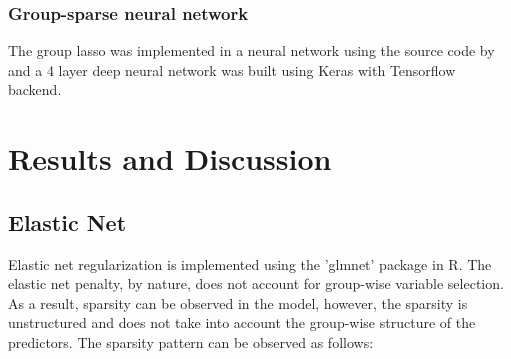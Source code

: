 \documentclass[a4paper,12pt]{article}
\begin{document}
    \subsubsection{Group-sparse neural network}
    The group lasso was implemented in a neural network using the source code by \cite{scardapane2017group} and a 4 layer deep neural network was built using Keras with Tensorflow backend.
    

    
	\newpage
	\section{Results and Discussion}
	\subsection{Elastic Net}
Elastic net regularization is implemented using the 'glmnet' package in R. The elastic net penalty, by nature, does not account for group-wise variable selection. As a result, sparsity can be observed in the model, however, the sparsity is unstructured and does not take into account the group-wise structure of the predictors. The sparsity pattern can be observed as follows:\\
\end{document}
